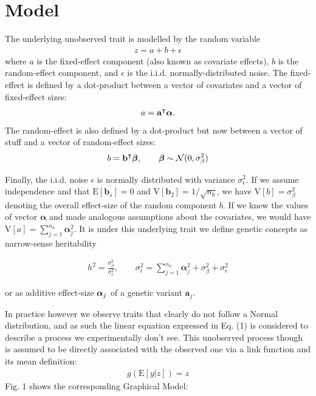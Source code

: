 \section{Model}

The underlying unobserved trait is modelled by the random variable
\begin{align*}
  z = a + b + \epsilon
\end{align*} where $a$ is the fixed-effect
component (also known as covariate effects), $b$ is the random-effect component,
and $\epsilon$ is the i.i.d. normally-distributed noise.
The fixed-effect is defined by a dot-product between a vector of covariates and
a vector of fixed-effect sizes:
\begin{align*}
  a = \mathbf a^\intercal \boldsymbol\alpha.
\end{align*}
The random-effect is also defined by a dot-product but now between
a vector of stuff and a vector of random-effect sizes:
\begin{align*}
  b = \mathbf b^\intercal \boldsymbol\beta, \qquad \boldsymbol\beta \sim \mathcal N(0, \sigma^2_{\beta})
\end{align*}

Finally, the i.i.d. noise $\epsilon$ is normally distributed with variance
$\sigma^2_{\epsilon}$. If we assume independence and that $\mathrm E[\mathbf
b_s] = 0$ and $\mathrm V[\mathbf b_2]=1/\sqrt{n_b}$, we have $\mathrm V[b] =
\sigma^2_{\beta}$ denoting the overall effect-size of the random component $b$.
If we knew the values of vector $\boldsymbol\alpha$ and made analogous
assumptions about the covariates, we would have $\mathrm V[a]  =
\sum_{j=1}^{n_a} \boldsymbol \alpha_j^2$.
It is under this underlying trait we
define genetic concepts as narrow-sense heritability

\begin{align*}
  h^2=\frac{\sigma^2_{\beta}}{\sigma_t^2}, \qquad \sigma_t^2 =
  \sum_{j=1}^{n_a} \boldsymbol \alpha_j^2 + \sigma^2_{\beta} +
  \sigma^2_{\epsilon}
\end{align*}

or as additive effect-size $\boldsymbol\alpha_j$ of a genetic variant $\mathbf a_j$.

In practice however we observe traits that clearly do not follow a Normal
distribution, and as such the linear equation expressed in Eq. (1) is
considered to describe a process we experimentally don't see.
This unobserved process though is assumed to be directly associated with the
observed one via a link function and its mean definition:
\begin{align*}
  g(\mathrm E[y|z]) = z
\end{align*}
Fig. 1 shows the corresponding Graphical Model:

